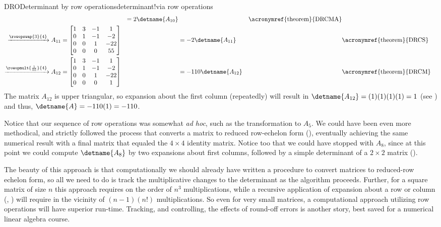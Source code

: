 \begin{example}{DRO}{Determinant by row operations}{determinant!via row operations}
\begin{align*}
&
&=2\detname{A_{10}}&&\text{\acronymref{theorem}{DRCMA}}\\
\xrightarrow{\rowopswap{3}{4}}
A_{11}&=
\begin{bmatrix}
1 & 3 &-1 & 1 \\
0 & 1 &-1 &-2 \\
0 & 0 & 1 &-22\\
0 & 0 & 0 &55
\end{bmatrix}
&
&=-2\detname{A_{11}}&&\text{\acronymref{theorem}{DRCS}}\\
\xrightarrow{\rowopmult{\frac{1}{55}}{4}}
A_{12}&=
\begin{bmatrix}
1 & 3 &-1 & 1 \\
0 & 1 &-1 &-2 \\
0 & 0 & 1 &-22\\
0 & 0 & 0 & 1
\end{bmatrix}
&
&=-110\detname{A_{12}}&&\text{\acronymref{theorem}{DRCM}}\\
\end{align*}
%
The matrix $A_{12}$ is upper triangular, so expansion about the first column (repeatedly) will result in $\detname{A_{12}}=(1)(1)(1)(1)=1$ (see ) and thus, $\detname{A}=-110(1)=-110$.\par
%
Notice that our sequence of row operations was somewhat {\it ad hoc}, such as the transformation to $A_5$.  We could have been even more methodical, and strictly followed the process that converts a matrix to reduced row-echelon form (), eventually achieving the same numerical result with a final matrix that equaled the $4\times 4$ identity matrix.  Notice too that we could have stopped with $A_8$, since at this point we could compute $\detname{A_8}$ by two expansions about first columns, followed by a simple determinant of a $2\times 2$ matrix ().\par
%
The beauty of this approach is that computationally we should already have written a procedure to convert matrices to reduced-row echelon form, so all we need to do is track the multiplicative changes to the determinant as the algorithm proceeds.   Further, for a square matrix of size $n$ this approach requires on the order of $n^3$ multiplications, while a recursive application of expansion about a row or column (, ) will require in the vicinity of $(n-1)(n!)$ multiplications.  So even for very small matrices, a computational approach utilizing row operations will have superior run-time.  Tracking, and controlling, the effects of round-off errors is another story, best saved for a numerical linear algebra course.
%
\end{example}
